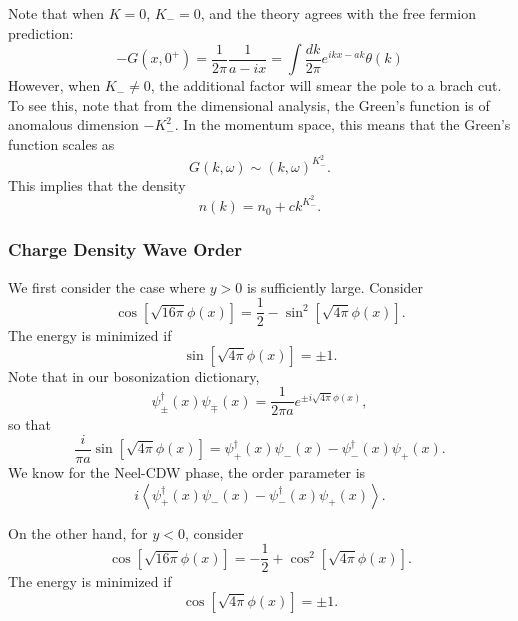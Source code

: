 \documentclass[aps,prb,superscriptaddress,nofootinbib]{revtex4}
\begin{document}
Note that when $K=0$, $K_-=0$, and the theory agrees with the free fermion prediction:
\begin{equation}
	-G(x, 0^+) = \frac{1}{2\pi} \frac{1}{a-ix}
	= \int \frac{dk}{2\pi} e^{ikx-ak} \theta(k)
\end{equation}
However, when $K_- \ne 0$, the additional factor will smear the pole to a brach cut. 
To see this, note that from the dimensional analysis, the Green's function is of anomalous dimension $-K_-^2$.
In the momentum space, this means that the Green's function scales as
\begin{equation}
	G(k,\omega) \sim (k,\omega)^{K_-^2}.
\end{equation}
This implies that the density 
\begin{equation}
	n(k) = n_0 + c k^{K_-^2}.
\end{equation}


\subsubsection{Charge Density Wave Order}
We first consider the case where $y>0$ is sufficiently large. 
Consider
\begin{equation}
	\cos\left[\sqrt{16\pi}\phi(x)\right] = \frac{1}{2} - \sin^2\left[\sqrt{4\pi}\phi(x)\right].
\end{equation}
The energy is minimized if 
\begin{equation}
	\sin\left[\sqrt{4\pi}\phi(x)\right] = \pm 1.
\end{equation}
Note that in our bosonization dictionary,
\begin{equation}
	\psi_{\pm}^\dagger(x)\psi_{\mp}(x) = \frac{1}{2\pi a} e^{\pm i\sqrt{4\pi}\phi(x)},
\end{equation}
so that
\begin{equation}
	\frac{i}{\pi a} \sin\left[\sqrt{4\pi}\phi(x)\right] = \psi_{+}^\dagger(x)\psi_{-}(x)-\psi_{-}^\dagger(x)\psi_{+}(x).
\end{equation}
We know for the Neel-CDW phase, the order parameter is
\begin{equation}
	i\left\langle \psi_{+}^\dagger(x)\psi_{-}(x)-\psi_{-}^\dagger(x)\psi_{+}(x) \right\rangle.
\end{equation}

On the other hand, for $y<0$, consider
\begin{equation}
	\cos\left[\sqrt{16\pi}\phi(x)\right] = -\frac{1}{2} + \cos^2\left[\sqrt{4\pi}\phi(x)\right].
\end{equation}
The energy is minimized if 
\begin{equation}
	\cos\left[\sqrt{4\pi}\phi(x)\right] = \pm 1.
\end{equation}
\end{document}
